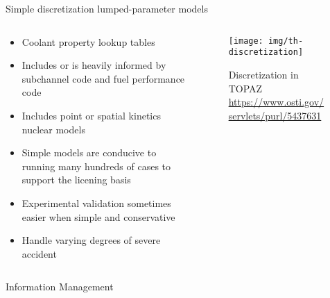 \documentclass[pdf,aspectratio=169]{beamer}
\begin{document}
\begin{frame}{Simple discretization lumped-parameter models}
\begin{columns}
    \begin{column}{0.5\textwidth}
    \begin{itemize}
        \item Coolant property lookup tables
        \item Includes or is heavily informed by subchannel code and fuel performance code
        \item Includes point or spatial kinetics nuclear models
        \item Simple models are conducive to running many hundreds of cases to support the
            licening basis
        \item Experimental validation sometimes easier when simple and conservative
        \item Handle varying degrees of severe accident
    \end{itemize}
    \end{column}
    \begin{column}{0.5\textwidth}
        \begin{figure}[ht]
        \centering
            \texttt{[image: img/th-discretization]}
            \caption{\tiny Discretization in TOPAZ
            \url{https://www.osti.gov/servlets/purl/5437631}}
        \end{figure}
    \end{column}
\end{columns}
\end{frame}
\begin{frame}[plain,c]
	\begin{center}
	\Huge Information Management
	\end{center}
\end{frame}
\end{document}
